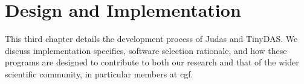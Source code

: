 \chapter{Design and Implementation}
\label{chap:method}

This third chapter details the development process of Judas and TinyDAS. We discuss implementation specifics, software selection rationale, and how these programs are designed to contribute to both our research and that of the wider scientific community, in particular members at \acrshort{cgf}.





% 




